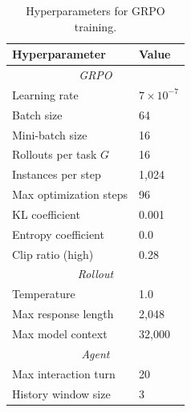 \begin{table}[t]
\centering
\caption{Hyperparameters for GRPO training.}
\label{tab:rl_hyper}
\small
\begin{tabular}{ll}
\toprule
\textbf{Hyperparameter} & \textbf{Value} \\
\midrule
\multicolumn{2}{c}{\textit{GRPO}} \\
\midrule
Learning rate & $7 \times 10^{-7}$ \\
Batch size & 64 \\
Mini-batch size & 16 \\
Rollouts per task $G$ & 16 \\
Instances per step & 1,024 \\
Max optimization steps & 96 \\
KL coefficient & 0.001 \\
Entropy coefficient & 0.0 \\
Clip ratio (high) & 0.28 \\
\midrule
\multicolumn{2}{c}{\textit{Rollout}} \\
\midrule
Temperature & 1.0 \\
Max response length & 2,048 \\
Max model context & 32,000 \\
\midrule
\multicolumn{2}{c}{\textit{Agent}} \\
\midrule
Max interaction turn & 20 \\
History window size & 3 \\
\bottomrule
\end{tabular}
\end{table}
